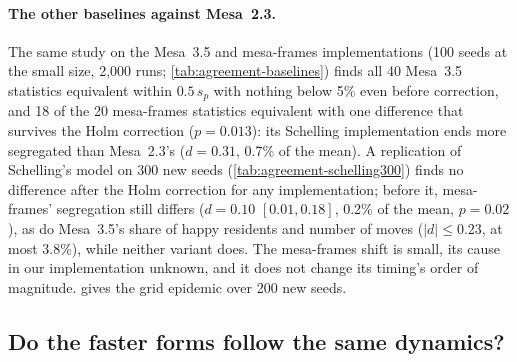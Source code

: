\paragraph{The other baselines against Mesa~2.3.} The same study on the Mesa~3.5 and
mesa-frames implementations (100 seeds at the small size, 2,000 runs;
\cref{tab:agreement-baselines}) finds all 40 Mesa~3.5 statistics equivalent within
$0.5\,s_p$ with nothing below 5\% even before correction, and 18 of the 20 mesa-frames
statistics equivalent with one difference that survives the Holm correction ($p = 0.013$):
its Schelling implementation ends more segregated than Mesa~2.3's ($d = 0.31$, 0.7\% of the
mean). A replication of Schelling's model on 300 new seeds (\cref{tab:agreement-schelling300})
finds no difference after the Holm correction for any implementation; before it, mesa-frames'
segregation still differs ($d = 0.10$ $[0.01, 0.18]$, 0.2\% of the mean, $p = 0.02$), as do
Mesa~3.5's share of happy residents and number of moves ($|d| \le 0.23$, at most 3.8\%),
while neither \modelly{} variant does. The mesa-frames shift is small, its cause in our
implementation unknown, and it does not change its timing's order of magnitude.
 gives the grid epidemic over 200 new seeds.

\begin{table}[htbp]
  \centering
  \small
  \caption{As \cref{tab:agreement}, at the large size of the timings, over 50 shared seeds per
  variant.}
  \label{tab:agreement-large}
  
\end{table}

\subsection{Do the faster forms follow the same dynamics?}
\label{sec:trajectories}

